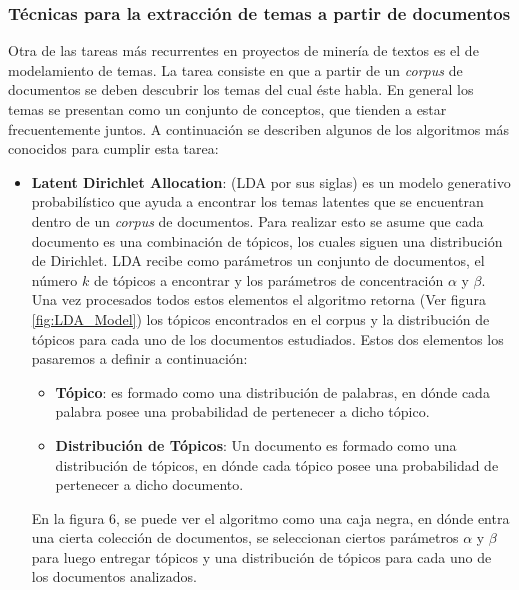 \subsubsection{Técnicas para la extracción de temas a partir de documentos}
    Otra de las tareas más recurrentes en proyectos de minería de textos es el de modelamiento de temas. La tarea consiste en que a partir de un \textit{corpus} de documentos se deben descubrir los temas del cual éste habla. En general los temas se presentan como un conjunto de conceptos, que tienden a estar frecuentemente juntos. A continuación se describen algunos de los algoritmos más conocidos para cumplir esta tarea:
    \begin{itemize}
\item \textbf{Latent Dirichlet Allocation}: \cite{blei2003latent} (LDA por sus siglas) es un modelo generativo probabilístico que ayuda a encontrar los temas latentes que se encuentran dentro de un \textit{corpus} de documentos. Para realizar esto se asume que cada documento es una combinación de tópicos, los cuales siguen una distribución de Dirichlet. LDA recibe como parámetros un conjunto de documentos, el número $k$ de tópicos a encontrar y los parámetros de concentración $\alpha$ y $\beta$. Una vez procesados todos estos elementos el algoritmo retorna (Ver figura \ref{fig:LDA_Model}) los tópicos encontrados en el corpus y la distribución de tópicos para cada uno de los documentos estudiados. Estos dos elementos los pasaremos a definir a continuación:
    
    \begin{itemize}
        \item \textbf{Tópico}: es formado como una distribución de palabras, en dónde cada palabra posee una probabilidad de pertenecer a dicho tópico.
        \item \textbf{Distribución de Tópicos}: Un documento es formado como una distribución de tópicos, en dónde cada tópico posee una probabilidad de pertenecer a dicho documento.
    \end{itemize}
    
    En la figura 6, se puede ver el algoritmo como una caja negra, en dónde entra una cierta colección de documentos, se seleccionan ciertos parámetros $\alpha$ y $\beta$ para luego entregar tópicos y una distribución de tópicos para cada uno de los documentos analizados.
    

\end{itemize}
